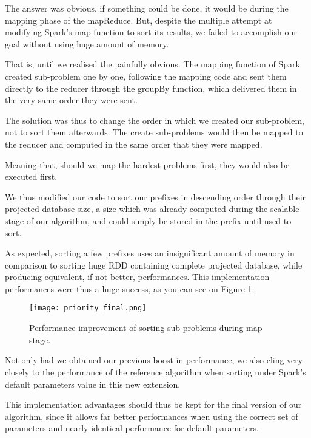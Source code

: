 \documentclass{eplmastersthesis}
\begin{document}
The answer was obvious, if something could be done, it would be during the mapping phase of the mapReduce. But, despite the multiple attempt at modifying Spark's map function to sort its results, we failed to accomplish our goal without using huge amount of memory.

That is, until we realised the painfully obvious. The mapping function of Spark created sub-problem one by one, following the mapping code and sent them directly to the reducer through the groupBy function, which delivered them in the very same order they were sent. \newline

The solution was thus to change the order in which we created our sub-problem, not to sort them afterwards. The create sub-problems would then be mapped to the reducer and computed in the same order that they were mapped.\newline

Meaning that, should we map the hardest problems first, they would also be executed first. \newline

We thus modified our code to sort our prefixes in descending order through their projected database size, a size which was already computed during the scalable stage of our algorithm, and could simply be stored in the prefix until used to sort. \newline

As expected, sorting a few prefixes uses an insignificant amount of memory in comparison to sorting huge RDD containing complete projected database, while producing equivalent, if not better, performances. This implementation performances were thus a huge success, as you can see on Figure \ref{fig:priority_scheduling_improved}. \newline

\begin{figure}[h]
  \centering
  \texttt{[image: priority\_final.png]}
  \caption{Performance improvement of sorting sub-problems during map stage.}
  \label{fig:priority_scheduling_improved}
\end{figure}

Not only had we obtained our previous boost in performance, we also cling very closely to the performance of the reference algorithm when sorting under Spark's default parameters value in this new extension. \newline

This implementation advantages should thus be kept for the final version of our algorithm, since it allows far better performances when using the correct set of parameters and nearly identical performance for default parameters.
\end{document}
